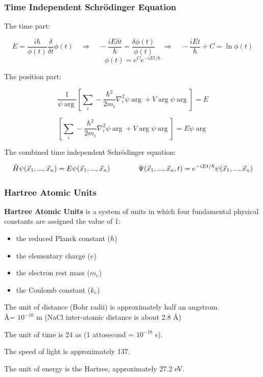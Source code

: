 \documentclass{beamer}
\begin{document}
\begin{frame}
\frametitle{Time Independent Schr\"odinger Equation}
The time part:

\[ E = \frac{i\hbar}{\phi(t)} \frac{\delta}{\delta t} \phi(t) \quad\Rightarrow\quad - \frac{i E \delta t}{\hbar} = \frac{\delta\phi(t)}{\phi(t)} \quad\Rightarrow\quad - \frac{i E t}{\hbar} + C = \ln \phi(t) \]
\[ \phi(t) = e^C e^{-iEt/\hbar}\]

The position part:

\[ \frac{1}{\psi\arg} \left[ \sum_i - \frac{\hbar^2}{2m_i}\nabla_i^2 \psi\arg + V\arg\psi\arg \right] = E \]

\[ \left[ \sum_i - \frac{\hbar^2}{2m_i}\nabla_i^2 \psi\arg + V\arg\psi\arg \right] = E \psi\arg \]

The combined time independent Schr\"odinger equation:

\[ \hat{H} \psi(\vec{x}_1,...,\vec{x}_n) = E \psi(\vec{x}_1,...,\vec{x}_n) \qquad\qquad \Psi(\vec{x}_1,...,\vec{x}_n,t) = e^{-iEt/\hbar} \psi(\vec{x}_1,...,\vec{x}_n)\]
\end{frame}

\begin{frame}
\frametitle{Hartree Atomic Units}
{\bf Hartree Atomic Units} is a system of units in which four fundamental physical constants
are assigned the value of 1:
\begin{itemize}
\item the reduced Planck constant ($\hbar$)
\item the elementary charge ($e$)
\item the electron rest mass ($m_e$)
\item the Coulomb constant ($k_e$)
\end{itemize}

\vskip 12pt

The unit of distance (Bohr radii) is approximately half an angstrom.\\
\qquad \AA = $10^{-10}$ m (NaCl inter-atomic distance is about 2.8 \AA)

\vskip 12pt

The unit of time is 24 as (1 attosecond = $10^{-18}$ s).

The speed of light is approximately 137.

The unit of energy is the Hartree, approximately 27.2 eV.
\end{frame}
\end{document}
